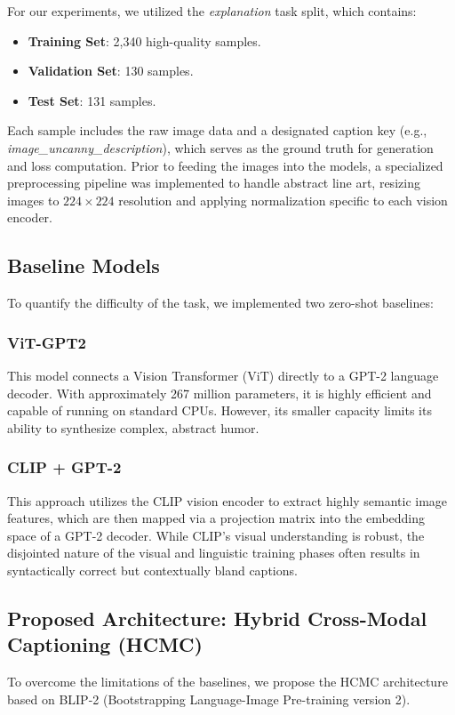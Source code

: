 \documentclass[10pt, conference, compsoc]{IEEEtran}
\begin{document}
For our experiments, we utilized the \textit{explanation} task split, which contains:
\begin{itemize}
    \item \textbf{Training Set}: 2,340 high-quality samples.
    \item \textbf{Validation Set}: 130 samples.
    \item \textbf{Test Set}: 131 samples.
\end{itemize}
Each sample includes the raw image data and a designated caption key (e.g., \textit{image\_uncanny\_description}), which serves as the ground truth for generation and loss computation. Prior to feeding the images into the models, a specialized preprocessing pipeline was implemented to handle abstract line art, resizing images to $224 \times 224$ resolution and applying normalization specific to each vision encoder.

\subsection{Baseline Models}
To quantify the difficulty of the task, we implemented two zero-shot baselines:

\subsubsection{ViT-GPT2}
This model connects a Vision Transformer (ViT) directly to a GPT-2 language decoder. With approximately 267 million parameters, it is highly efficient and capable of running on standard CPUs. However, its smaller capacity limits its ability to synthesize complex, abstract humor.

\subsubsection{CLIP + GPT-2}
This approach utilizes the CLIP vision encoder to extract highly semantic image features, which are then mapped via a projection matrix into the embedding space of a GPT-2 decoder. While CLIP's visual understanding is robust, the disjointed nature of the visual and linguistic training phases often results in syntactically correct but contextually bland captions.

\subsection{Proposed Architecture: Hybrid Cross-Modal Captioning (HCMC)}
To overcome the limitations of the baselines, we propose the HCMC architecture based on BLIP-2 (Bootstrapping Language-Image Pre-training version 2). 
\end{document}

